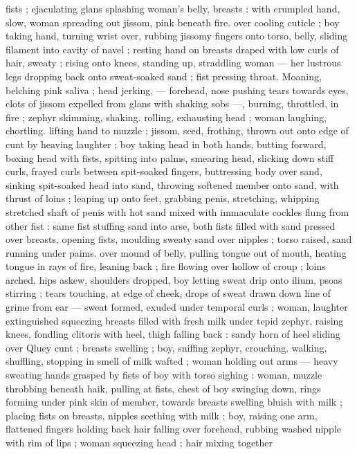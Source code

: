 {fists ; ejaculating glans splashing woman's belly, breasts : with 
crumpled hand, slow, woman spreading out jissom, pink beneath fire. 
over cooling cuticle ; boy taking hand, turning wrist over, rubbing 
jissomy fingers onto torso, belly, sliding filament into cavity of navel 
; resting hand on breasts draped with low curls of hair, sweaty ; rising 
onto knees, standing up, straddling woman --- her lustrous legs 
dropping back onto sweat-soaked sand ; fist pressing throat. 
Moaning, belching pink saliva ; head jerking, --- forehead, nose 
pushing tears towards eyes, clots of jissom expelled from glans with 
shaking sobs ---, burning, throttled, in fire ; zephyr skimming, 
shaking. rolling, exhausting head ; woman laughing, chortling. lifting 
hand to muzzle ; jissom, seed, frothing, thrown out onto edge of cunt 
by heaving laughter ; boy taking head in both hands, butting forward, 
boxing head with fists, spitting into palms, smearing head, slicking 
down stiff curls, frayed curls between spit-soaked fingers, 
buttressing body over sand, sinking spit-soaked head into sand, 
throwing softened member onto sand, with thrust of loins ; leaping 
up onto feet, grabbing penis, stretching, whipping stretched shaft of 
penis with hot sand mixed with immaculate cockles flung from other 
fist : same fist stuffing sand into arse, both fists filled with sand 
pressed over breasts, opening fists, moulding sweaty sand over 
nipples ; torso raised, sand running under paims. over mound of 
belly, pulling tongue out of mouth, heating tongue in rays of fire, 
leaning back ; fire flowing over hollow of croup ; loins arched. hips 
askew, shoulders dropped, boy letting sweat drip onto ilium, psoas 
stirring ; tears touching, at edge of cheek, drops of sweat drawn 
down line of grime from ear --- sweat formed, exuded under 
temporal curls ; woman, laughter extinguished squeezing breasts 
filled with fresh milk under tepid zephyr, raising knees, fondling 
clitoris with heel, thigh falling back : sandy horn of heel sliding over 
Qluey cunt ; breasts swelling ; boy, sniffing zephyr, crouching. 
walking, shuffling, stopping in smell of milk wafted ; woman holding 
out arms --- heavy sweating hands grasped by fists of boy with torso 
sighing : woman, muzzle throbbing beneath haik, pulling at fists, 
chest of boy swinging down, rings forming under pink skin of 
member, towards breasts swelling bluish with milk ; placing fists on 
breasts, nipples seething with milk ; boy, raising one arm, flattened 
fingers holding back hair falling over forehead, rubbing washed 
nipple with rim of lips ; woman squeezing head ; hair mixing together 
}
